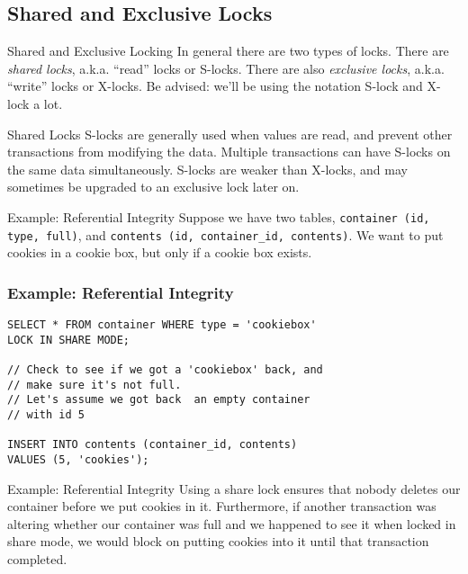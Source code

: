 \documentclass[14pt]{beamer}
\begin{document}
\subsection{Shared and Exclusive Locks}

\begin{frame}{Shared and Exclusive Locking}
  In general there are two types of locks. There are \emph{shared locks}, a.k.a.
  ``read'' locks or S-locks.
  \newline
  \newline
  There are also \emph{exclusive locks}, a.k.a. ``write'' locks or X-locks.
  \newline
  \newline
  \pause
  Be advised: we'll be using the notation S-lock and X-lock a lot.
\end{frame}

\begin{frame}{Shared Locks}
  S-locks are generally used when values are read, and prevent other
  transactions from modifying the data. Multiple transactions can have S-locks
  on the same data simultaneously.
  \newline
  \newline
  S-locks are weaker than X-locks, and may sometimes be upgraded to
  an exclusive lock later on.
\end{frame}

\begin{frame}{Example: Referential Integrity}
  Suppose we have two tables, \texttt{container (id, type, full)}, and
  \texttt{contents (id, container\_id, contents)}. We want to put cookies in a
  cookie box, but only if a cookie box exists.
\end{frame}

\begin{frame}[fragile]
  \frametitle{Example: Referential Integrity}
  \begingroup
    \fontsize {10pt}{12pt}\selectfont
    \begin{verbatim}
SELECT * FROM container WHERE type = 'cookiebox'
LOCK IN SHARE MODE;

// Check to see if we got a 'cookiebox' back, and
// make sure it's not full.
// Let's assume we got back  an empty container
// with id 5

INSERT INTO contents (container_id, contents)
VALUES (5, 'cookies');
    \end{verbatim}
  \endgroup
\end{frame}

\begin{frame}{Example: Referential Integrity}
  Using a share lock ensures that nobody deletes our container before we put
  cookies in it. Furthermore, if another transaction was altering whether our
  container was full and we happened to see it when locked in share mode, we
  would block on putting cookies into it until that transaction completed.
\end{frame}
\end{document}
